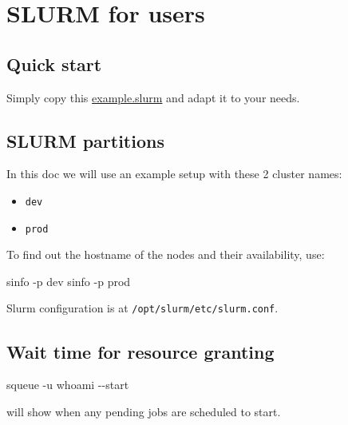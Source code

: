 \documentclass[
]{report}
\author{}
\date{2024-02-20}
\newenvironment{Shaded}{\begin{snugshade}}{\end{snugshade}}
\newcommand{\AttributeTok}[1]{\textcolor[rgb]{0.40,0.45,0.13}{#1}}
\newcommand{\ExtensionTok}[1]{\textcolor[rgb]{0.00,0.23,0.31}{#1}}
\newcommand{\FunctionTok}[1]{\textcolor[rgb]{0.28,0.35,0.67}{#1}}
\newcommand{\KeywordTok}[1]{\textcolor[rgb]{0.00,0.23,0.31}{#1}}
\newcommand{\NormalTok}[1]{\textcolor[rgb]{0.00,0.23,0.31}{#1}}
\providecommand{\tightlist}{%
  \setlength{\itemsep}{0pt}\setlength{\parskip}{0pt}}\usepackage{longtable,booktabs,array}
\begin{document}
\chapter{SLURM for users}\label{slurm-for-users}

\section{Quick start}\label{quick-start}

Simply copy this \href{./example.slurm}{example.slurm} and adapt it to
your needs.

\section{SLURM partitions}\label{slurm-partitions}

In this doc we will use an example setup with these 2 cluster names:

\begin{itemize}
\tightlist
\item
  \texttt{dev}
\item
  \texttt{prod}
\end{itemize}

To find out the hostname of the nodes and their availability, use:

\begin{Shaded}
\begin{Highlighting}[]
\ExtensionTok{sinfo} \AttributeTok{{-}p}\NormalTok{ dev}
\ExtensionTok{sinfo} \AttributeTok{{-}p}\NormalTok{ prod}
\end{Highlighting}
\end{Shaded}

Slurm configuration is at \texttt{/opt/slurm/etc/slurm.conf}.

\section{Wait time for resource
granting}\label{wait-time-for-resource-granting}

\begin{Shaded}
\begin{Highlighting}[]
\ExtensionTok{squeue} \AttributeTok{{-}u} \KeywordTok{\textasciigrave{}}\FunctionTok{whoami}\KeywordTok{\textasciigrave{}} \AttributeTok{{-}{-}start}
\end{Highlighting}
\end{Shaded}

will show when any pending jobs are scheduled to start.
\end{document}
